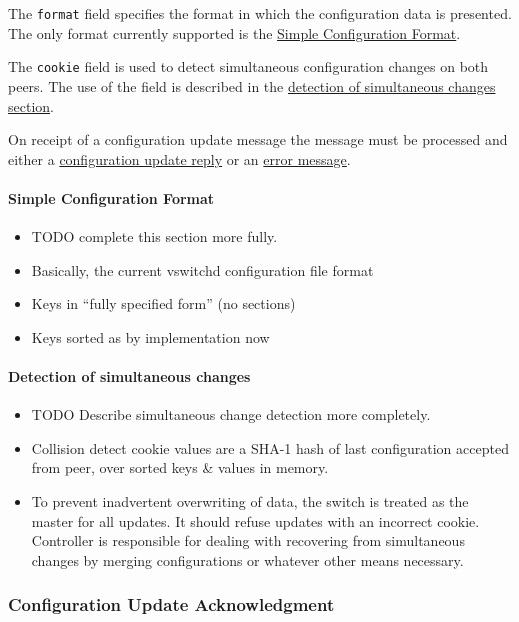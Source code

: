 \documentclass[11pt,a4paper]{article}
\begin{document}
    The \verb|format| field specifies the format in which the
    configuration data is presented.  The only format currently
    supported is the \hyperref[sec-2.8.4.1]{Simple Configuration Format}.

    The \verb|cookie| field is used to detect simultaneous configuration
    changes on both peers.  The use of the field is described in the
    \hyperref[sec-2.8.4.2]{detection of simultaneous changes section}.

    On receipt of a configuration update message the message must be
    processed and either a \hyperref[*==Configuration==Update==Reply]{configuration update reply} or an
    \hyperref[sec-2.6.5]{error message}.

\paragraph{Simple Configuration Format}
\label{sec-2.8.4.1}

\begin{itemize}
\item TODO complete this section more fully.
\item Basically, the current vswitchd configuration file format
\item Keys in ``fully specified form'' (no sections)
\item Keys sorted as by implementation now
\end{itemize}
\paragraph{Detection of simultaneous changes}
\label{sec-2.8.4.2}

\begin{itemize}
\item TODO Describe simultaneous change detection more completely.
\item Collision detect cookie values are a SHA-1 hash of last
       configuration accepted from peer, over sorted keys \& values in
       memory.
\item To prevent inadvertent overwriting of data, the switch is
       treated as the master for all updates.  It should refuse
       updates with an incorrect cookie.  Controller is responsible
       for dealing with recovering from simultaneous changes by
       merging configurations or whatever other means necessary.
\end{itemize}
\subsubsection{Configuration Update Acknowledgment}
\label{sec-2.8.5}
\end{document}
